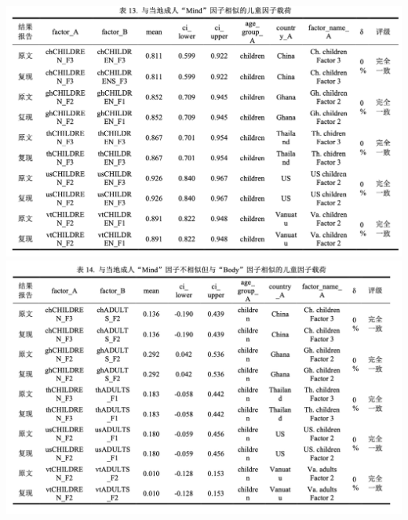 \documentclass[
  man]{apa6}
\begin{document}
\includegraphics{./Script_Re_Weisman_2021_Group1_2024_files/Repeatability_figures/table13.png}
\includegraphics{./Script_Re_Weisman_2021_Group1_2024_files/Repeatability_figures/table14.png}
\end{document}
